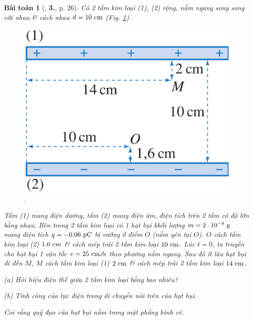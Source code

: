 \documentclass[oneside]{book}
\numberwithin{equation}{section}
\newtheorem{baitoan}{Bài toán}[section]
\begin{document}
\begin{baitoan}[\cite{SGK_Vat_Ly_11_nang_cao}, \textbf{3.}, p. 26]
	Có 2 tấm kim loại (1), (2) rộng, nằm ngang song song với nhau \& cách nhau $d = 10\ {\rm cm}$ (Fig. \ref{fig:2_tam_kim_loai_song_song}).
	
	\begin{figure}[H]
		\centering
		\includegraphics[scale=0.15]{2_tam_kim_loai_song_song}
		\caption{\cite[Hình 5.3, p. 26]{SGK_Vat_Ly_11_nang_cao}.}
		\label{fig:2_tam_kim_loai_song_song}
	\end{figure}
	Tấm (1) mang điện dương, tấm (2) mang điện âm, điện tích trên 2 tấm có độ lớn bằng nhau. Bên trong 2 tấm kim loại có 1 hạt bụi khối lượng $m = 2\cdot 10^{-9}\ {\rm g}$ mang điện tích $q = -0.06\ {\rm pC}$ bị vướng ở điểm $O$ (nằm yên tại $O$). $O$ cách tấm kim loại (2) $1.6\ {\rm cm}$ \& cách mép trái 2 tấm kim loại $10\ {\rm cm}$. Lúc $t = 0$, ta truyền cho hạt bụi 1 vận tốc $v = 25\ {\rm cm\emph{\texttt{/}}s}$ theo phương nằm ngang. Sau đó ít lâu hạt bụi đi đến $M$, $M$ cách tấm kim loại (1) $2\ {\rm cm}$ \& cách mép trái 2 tấm kim loại $14\ {\rm cm}$.
	\begin{enumerate*}
		\item[(a)] Hỏi hiệu điện thế giữa 2 tấm kim loại bằng bao nhiêu?
		\item[(b)] Tính công của lực điện trong di chuyển nói trên của hạt bụi.
	\end{enumerate*}
	Coi rằng quỹ đạo của hạt bụi nằm trong mặt phẳng hình vẽ.
	\begin{figure}[H]
		\centering

\end{figure}
\end{baitoan}
\end{document}

